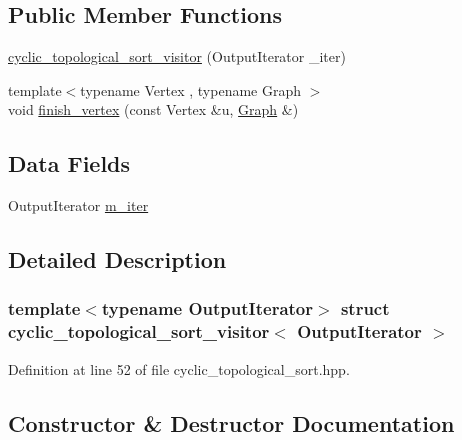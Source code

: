 \subsection*{Public Member Functions}
\begin{DoxyCompactItemize}
\item 
\hyperlink{structcyclic__topological__sort__visitor_a2627a5c21c4ca42f19d79e42625f1487}{cyclic\+\_\+topological\+\_\+sort\+\_\+visitor} (Output\+Iterator \+\_\+iter)
\item 
{\footnotesize template$<$typename Vertex , typename Graph $>$ }\\void \hyperlink{structcyclic__topological__sort__visitor_a8fb34e752238607d7213c50ae514dd3f}{finish\+\_\+vertex} (const Vertex \&u, \hyperlink{structGraph}{Graph} \&)
\end{DoxyCompactItemize}
\subsection*{Data Fields}
\begin{DoxyCompactItemize}
\item 
Output\+Iterator \hyperlink{structcyclic__topological__sort__visitor_a3ca56c98de4016813491390a6845b35d}{m\+\_\+iter}
\end{DoxyCompactItemize}


\subsection{Detailed Description}
\subsubsection*{template$<$typename Output\+Iterator$>$\newline
struct cyclic\+\_\+topological\+\_\+sort\+\_\+visitor$<$ Output\+Iterator $>$}



Definition at line 52 of file cyclic\+\_\+topological\+\_\+sort.\+hpp.



\subsection{Constructor \& Destructor Documentation}
\mbox{\label{structcyclic__topological__sort__visitor_a2627a5c21c4ca42f19d79e42625f1487}} 
